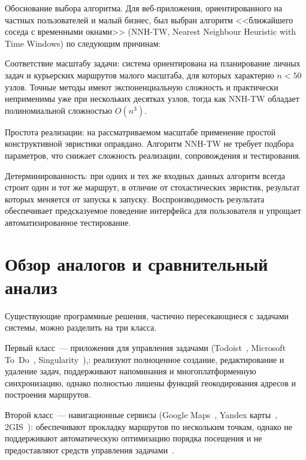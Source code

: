 Обоснование выбора алгоритма. Для веб-приложения, ориентированного на частных пользователей
и малый бизнес, был выбран алгоритм <<ближайшего соседа с временными окнами>>
(NNH-TW, Nearest Neighbour Heuristic with Time Windows) по следующим причинам:

\begin{compactlistdot}
  \item Соответствие масштабу задачи: система ориентирована на планирование
        личных задач и курьерских маршрутов малого масштаба, для которых
        характерно $n < 50$ узлов. Точные методы имеют
        экспоненциальную сложность и практически неприменимы уже при
        нескольких десятках узлов, тогда как NNH-TW обладает полиномиальной
        сложностью $O(n^3)$.
  \item Простота реализации: на рассматриваемом масштабе применение
        простой конструктивной эвристики оправдано. Алгоритм NNH-TW не требует подбора параметров,
        что снижает сложность реализации, сопровождения и тестирования.
  \item Детерминированность: при одних и тех же входных данных алгоритм
        всегда строит один и тот же маршрут, в отличие от стохастических
        эвристик, результат которых меняется от запуска к запуску.
        Воспроизводимость результата обеспечивает предсказуемое поведение
        интерфейса для пользователя и упрощает автоматизированное тестирование.
\end{compactlistdot}

\section{Обзор аналогов и сравнительный анализ}

Существующие программные решения, частично пересекающиеся с задачами
системы, можно разделить на три класса.

Первый класс~--- приложения для управления задачами
(Todoist~\cite{todoist}, Microsoft To~Do~\cite{ms_todo}, Singularity~\cite{singularity}),:
реализуют полноценное создание, редактирование и удаление задач,
поддерживают напоминания и многоплатформенную синхронизацию,
однако полностью лишены функций геокодирования адресов и построения маршрутов.

Второй класс~--- навигационные сервисы
(Google Maps~\cite{google_maps}, Yandex карты~\cite{yandex_maps}, 2GIS~\cite{2gis}):
обеспечивают прокладку маршрутов по нескольким точкам,
однако не поддерживают автоматическую оптимизацию порядка посещения
и не предоставляют средств управления задачами~\cite{google_maps_help}.

